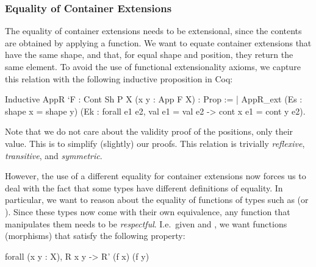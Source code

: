 \documentclass[anonymous, a4paper, UKenglish, cleveref, autoref, thm-restate]{lipics-v2021}
\begin{document}
\subsubsection{Equality of Container Extensions}
The equality of container extensions needs to be extensional, since the
contents are obtained by applying a function. We want to equate container
extensions that have the same shape, and that, for equal shape and position,
they return the same element. To avoid the use of functional extensionality
axioms, we capture this relation with the following inductive proposition in
Coq:
\begin{coqcode}
Inductive AppR `{F : Cont Sh P} {X} (x y : App F X) : Prop :=
| AppR_ext (Es : shape x = shape y)
           (Ek : forall e1 e2, val e1 = val e2 -> cont x e1 = cont y e2).
\end{coqcode}
Note that  we do not care about the validity proof of the positions, only their
value. This is to simplify (slightly) our proofs. This relation is
trivially \emph{reflexive}, \emph{transitive}, and \emph{symmetric}.

However, the use of a different equality for container extensions now forces us
to deal with the fact that some types have different definitions of equality.
In particular, we want to reason about the equality of functions of types such
as  (or ). Since 
these types now come with their own equivalence, any function that manipulates
them needs to be \emph{respectful}. I.e.\ given 
 and ,
we want functions (morphisms) that satisfy the following property:
\begin{coqcode}
forall (x y : X), R x y -> R' (f x) (f y)
\end{coqcode}
\end{document}
